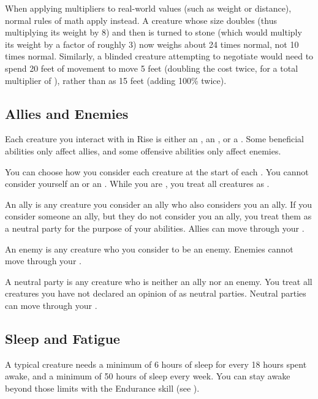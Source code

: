             When applying multipliers to real-world values (such as weight or distance), normal rules of math apply instead.
            A creature whose size doubles (thus multiplying its weight by 8) and then is turned to stone (which would multiply its weight by a factor of roughly 3) now weighs about 24 times normal, not 10 times normal.
            Similarly, a blinded creature attempting to negotiate  would need to spend 20 feet of movement to move 5 feet (doubling the cost twice, for a total multiplier of ), rather than as 15 feet (adding 100\% twice).

    \subsection{Allies and Enemies}\label{Allies and Enemies}
        Each creature you interact with in Rise is either an , an , or a .
        Some beneficial abilities only affect allies, and some offensive abilities only affect enemies.

        You can choose how you consider each creature at the start of each .
        You cannot consider yourself an  or an .
        While you are \unconscious, you treat all creatures as .

         An ally is any creature you consider an ally who also considers you an ally.
        If you consider someone an ally, but they do not consider you an ally, you treat them as a neutral party for the purpose of your abilities.
        Allies can move through your .

         An enemy is any creature who you consider to be an enemy.
        Enemies cannot move through your .

         A neutral party is any creature who is neither an ally nor an enemy.
        You treat all creatures you have not declared an opinion of as neutral parties.
        Neutral parties can move through your .

    \subsection{Sleep and Fatigue}\label{Sleep and Fatigue}
        A typical creature needs a minimum of 6 hours of sleep for every 18 hours spent awake, and a minimum of 50 hours of sleep every week.
        You can stay awake beyond those limits with the Endurance skill (see ).

